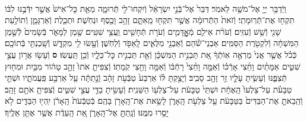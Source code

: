 \documentclass[twoside, openany, parskip=half, 11pt]{book}
\begin{document}
\begin{footnotesize}
\begin{multicols}{2}
\\
וַיְֿדַבֵּ֥ר יְיָ֖ אֶל־מֹשֶׁ֥ה לֵּאמֹֽר׃ דַּבֵּר֙ אֶל־בְּֿנֵ֣י יִשְׂרָאֵ֔ל וְֿיִקְחוּ־לִ֖י תְּֿרוּמָ֑ה מֵאֵ֤ת כׇּל־אִישׁ֙ אֲשֶׁ֣ר יִדְּֿבֶ֣נּוּ לִבּ֔וֹ תִּקְח֖וּ אֶת־תְּֿרֽוּמָתִֽי׃ וְֿזֹאת֙ הַתְּֿרוּמָ֔ה אֲשֶׁ֥ר תִּקְח֖וּ מֵֽאִתָּ֑ם זָהָ֥ב וָכֶ֖סֶף וּנְחֹֽשֶׁת׃ וּתְכֵ֧לֶת וְֿאַרְגָּמָ֛ן וְֿתוֹלַ֥עַת שָׁנִ֖י וְֿשֵׁ֥שׁ וְֿעִזִּֽים׃ וְֿעֹרֹ֨ת אֵילִ֧ם מְֿאׇׇׇׇׇׇָדָּמִ֛ים וְֿעֹרֹ֥ת תְּֿחָשִׁ֖ים וַֽעֲצֵ֥י שִׁטִּֽים׃  שֶׁ֖מֶן לַמָּאֹ֑ר בְּֿשָׂמִים֙ לְֿשֶׁ֣מֶן הַמִּשְׁחָ֔ה וְֿלִקְטֹ֖רֶת הַסַּמִּֽים׃ אַבְנֵי־שֹׁ֕הַם וְֿאַבְנֵ֖י מִלֻּאִ֑ים לָֽאֵפֹ֖ד וְֿלַחֹֽשֶׁן׃ וְֿעָ֥שׂוּ לִ֖י מִקְדָּ֑שׁ וְֿשָֽׁכַנְתִּ֖י בְּֿתוֹכָֽם׃ כְּֿכֹ֗ל אֲשֶׁ֤ר אֲנִי֙ מַרְאֶ֣ה אֽוֹתְֿךָ֔ אֵ֚ת תַּבְנִ֣ית הַמִּשְׁכָּ֔ן וְֿאֵ֖ת תַּבְנִ֣ית כׇּל־כֵּלָ֑יו וְֿכֵ֖ן תַּֽעֲשֽׂוּ׃ \textbf{ס}  וְֿעָשׂ֥וּ אֲר֖וֹן עֲצֵ֣י שִׁטִּ֑ים אַמָּתַ֨יִם וָחֵ֜צִי אָרְֿכּ֗וֹ וְֿאַמָּ֤ה וָחֵ֨צִי֙ רָחְֿבּ֔וֹ וְֿאַמָּ֥ה וָחֵ֖צִי קֹֽמָתֽוֹ׃ וְֿצִפִּיתָ֤ אֹתוֹ֙ זָהָ֣ב טָה֔וֹר מִבַּ֥יִת וּמִח֖וּץ תְּֿצַפֶּ֑נּוּ וְֿעָשִׂ֧יתָ עָלָ֛יו זֵ֥ר זָהָ֖ב סָבִֽיב׃ וְֿיָצַ֣קְתָּ לּ֗וֹ אַרְבַּע֙ טַבְּֿעֹ֣ת זָהָ֔ב וְֿנָ֣תַתָּ֔ה עַ֖ל אַרְבַּ֣ע פַּֽעֲמֹתָ֑יו וּשְׁתֵּ֣י טַבָּעֹ֗ת עַל־צַלְעוֹ֙ הָֽאֶחָ֔ת וּשְׁתֵּי֙ טַבָּעֹ֔ת עַל־צַלְע֖וֹ הַשֵּׁנִֽית׃ וְֿעָשִׂ֥יתָ בַדֵּ֖י עֲצֵ֣י שִׁטִּ֑ים וְֿצִפִּיתָ֥ אֹתָ֖ם זָהָֽב׃ וְֿהֵֽבֵאתָ֤ אֶת־הַבַּדִּים֙ בַּטַּבָּעֹ֔ת עַ֖ל צַלְעֹ֣ת הָֽאָרֹ֑ן לָשֵׂ֥את אֶת־הָֽאָרֹ֖ן בָּהֶֽם׃ בְּֿטַבְּֿעֹת֙ הָֽאָרֹ֔ן יִֽהְי֖וּ הַבַּדִּ֑ים לֹ֥א יָסֻ֖רוּ מִמֶּֽנּוּ׃ וְֿנָֽתַתָּ֖ אֶל־הָֽאָרֹ֑ן אֵ֚ת הָֽעֵדֻ֔ת אֲשֶׁ֥ר אֶתֵּ֖ן אֵלֶֽיךָ׃


\end{multicols}
\end{footnotesize}
\end{document}
